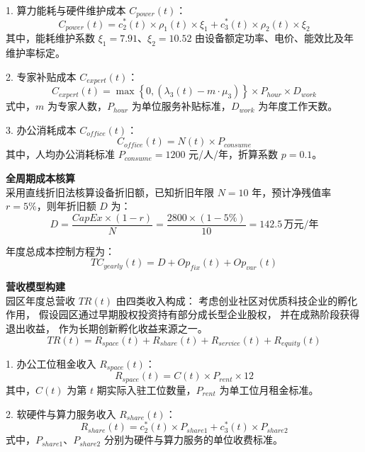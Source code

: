 \documentclass[12pt,a4paper]{article}
\begin{document}
1.  算力能耗与硬件维护成本 $C_{power}(t)$：
    \begin{equation}
    C_{power}(t) = c_2^*(t) \times \rho_1(t) \times \xi_1 + c_3^*(t) \times \rho_2(t) \times \xi_2
    \end{equation}
    其中，能耗维护系数 $\xi_1=7.91$、$\xi_2=10.52$ 由设备额定功率、电价、能效比及年维护率标定。

2.  专家补贴成本 $C_{expert}(t)$：
    \begin{equation}
    C_{expert}(t) = \max\left\{ 0, \left( \lambda_3(t) - m \cdot \mu_3 \right) \right\} \times P_{hour} \times D_{work}
    \end{equation}
    式中，$m$ 为专家人数，$P_{hour}$ 为单位服务补贴标准，$D_{work}$ 为年度工作天数。

3.  办公消耗成本 $C_{office}(t)$：
    \begin{equation}
    C_{office}(t) = N(t) \times P_{consume}
    \end{equation}
    其中，人均办公消耗标准 $P_{consume}=1200$ 元/人/年，折算系数 $p=0.1$。

\textbf{全周期成本核算}\\
采用直线折旧法核算设备折旧额，已知折旧年限 $N=10$ 年，预计净残值率 $r=5\%$，则年折旧额 $D$ 为：
\begin{equation}
D = \frac{CapEx \times (1 - r)}{N} = \frac{2800 \times (1-5\%)}{10} = 142.5\,\text{万元/年}
\end{equation}

年度总成本控制方程为：
\begin{equation}
TC_{yearly}(t) = D + Op_{fix}(t) + Op_{var}(t)
\end{equation}

\textbf{营收模型构建}\\
园区年度总营收 $TR(t)$ 由四类收入构成：
考虑创业社区对优质科技企业的孵化作用，
假设园区通过早期股权投资持有部分成长型企业股权，
并在成熟阶段获得退出收益，
作为长期创新孵化收益来源之一。
\begin{equation}
TR(t) = R_{space}(t) + R_{share}(t) + R_{service}(t) + R_{equity}(t)
\end{equation}

1.  办公工位租金收入 $R_{space}(t)$：
    \begin{equation}
    R_{space}(t) = C(t) \times P_{rent} \times 12
    \end{equation}
    其中，$C(t)$ 为第 $t$ 期实际入驻工位数量，$P_{rent}$ 为单工位月租金标准。

2.  软硬件与算力服务收入 $R_{share}(t)$：
    \begin{equation}
    R_{share}(t) = c_2^*(t) \times P_{share1} + c_3^*(t) \times P_{share2}
    \end{equation}
    式中，$P_{share1}$、$P_{share2}$ 分别为硬件与算力服务的单位收费标准。
\end{document}
